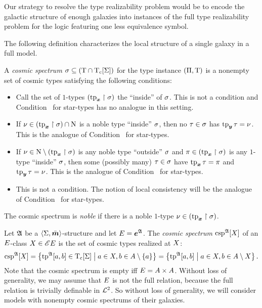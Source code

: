 Our strategy to resolve the type realizability problem would be to encode the
galactic structure of enough galaxies into instances of the full type
realizability problem for the logic featuring one less equivalence symbol.

The following definition characterizes the local structure of a single galaxy in
a full model.
\begin{definition}
A \emph{cosmic spectrum} $\sigma \subseteq (\mathrm{T} \cap \mathrm{T}_{\mathrm{c}}[\mathrm{\Sigma}])$ for the
type instance $(\Pi,\mathrm{T})$ is a nonempty set of cosmic types satisfying
the following conditions:
\begin{itemize}
  \item[\cspcondIp]\label{cond:csp-Ip}
  Call the set of $1$-types $(\operatorname{tp}_{\bm{x}}\restriction\sigma)$ the ``inside'' of $\sigma$.
  This is not a condition and Condition~ for star-types has no
  analogue in this setting.
  \item[\cspcondIIp]\label{cond:csp-IIp}
  If $\nu \in (\operatorname{tp}_{\bm{x}}\restriction\sigma) \cap \mathrm{\mathrm{N}}$ is a noble type
  ``inside'' $\sigma$, then no $\tau \in \sigma$ has $\operatorname{tp}_{\bm{y}}\tau = \nu$.
  This is the analogue of Condition~ for star-types.
  \item[\cspcondIIIp]\label{cond:csp-IIIp}
  If $\nu \in \mathrm{\mathrm{N}} \setminus (\operatorname{tp}_{\bm{x}}\restriction\sigma)$ is any noble type ``outside''
  $\sigma$ and $\pi \in (\operatorname{tp}_{\bm{x}}\restriction\sigma)$ is any $1$-type ``inside''
  $\sigma$, then some (possibly many) $\tau \in \sigma$ have 
  $\operatorname{tp}_{\bm{x}}\tau = \pi$ and $\operatorname{tp}_{\bm{y}}\tau = \nu$.
  This is the analogue of Condition~ for star-types.
  \item[\cspcondIVp]\label{cond:csp-IVp}
  This is not a condition. The notion of local consistency
  will be the analogue of Condition~ for star-types.
\end{itemize}
The cosmic spectrum is \emph{noble} if there is a noble $1$-type $\nu \in
(\operatorname{tp}_{\bm{x}}\restriction\sigma)$.
\end{definition}
\begin{definition}
Let $\mathfrak{A}$ be a $\left\langle \mathrm{\Sigma},\bar{\bm{m}} \right\rangle$-structure and let $E = \bm{e}^{\mathfrak{A}}$.
The \emph{cosmic spectrum} $\operatorname{csp}^{\mathfrak{A}}[X]$ of an $E$-class
$X \in {\mathscr{E}E}$ is the set of cosmic types realized at $X$:
\[
  \operatorname{csp}^{\mathfrak{A}}[X] = \left\{\operatorname{tp}^{\mathfrak{A}}[a,b] \in \mathrm{T}_{\mathrm{c}}[\mathrm{\Sigma}]\mathrel{}\middle|\mathrel{}a\in X, b 
  \in A\setminus\left\{a\right\}\right\} = \left\{\operatorname{tp}^{\mathfrak{A}}[a,b]\mathrel{}\middle|\mathrel{}a \in X, b \in
  A \setminus X\right\}.
\]
Note that the cosmic spectrum is empty iff $E = A\times A$.
Without loss of generality, we may assume that $E$ is not the full relation,
because the full relation is trivially definable in $\mathcal{L}^{2}$. So without loss of
generality, we will consider models with nonempty cosmic spectrums of their
galaxies.
\end{definition}

